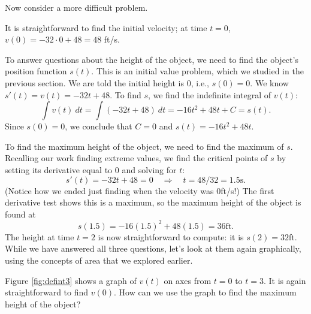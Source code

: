 Now consider a more difficult problem.\\

{It is straightforward to find the initial velocity; at time $t=0$, $v(0) =-32\cdot 0+48 = 48 $ ft/s.

To answer questions about the height of the object, we need to find the object's position function $s(t)$. This is an initial value problem, which we studied in the previous section. We are told the initial height is 0, i.e., $s(0) = 0$. We know $s'(t) = v(t) = -32t+48$. To find $s$, we find the indefinite integral of $v(t)$:
		$$\int v(t)\ dt = \int (-32t+48)\ dt = -16t^2+48t+C = s(t).$$
Since $s(0) = 0$, we conclude that $C=0$ and $s(t) = -16t^2+48t$.

To find the maximum height of the object, we need to find the maximum of $s$. Recalling our work finding extreme values, we find the critical points of $s$ by setting its derivative equal to 0 and solving for $t$:
		$$s'(t) = -32t+48 = 0 \quad \Rightarrow \quad t=48/32 = 1.5\text{s}.$$
(Notice how we ended just finding when the velocity was 0ft/s!) The first derivative test shows this is a maximum, so the maximum height of the object is found at $$s(1.5) = -16(1.5)^2+48(1.5)=36\text{ft}.$$
The height at time $t=2$ is now straightforward to compute: it is $s(2) = 32$ft.\\

While we have answered all three questions, let's look at them again graphically, using the concepts of area that we explored earlier.


Figure \ref{fig:defint3} shows a graph of $v(t)$ on axes from $t=0$ to $t=3$. It is again straightforward to find $v(0)$. How can we use the graph to find the maximum height of the object?


}
